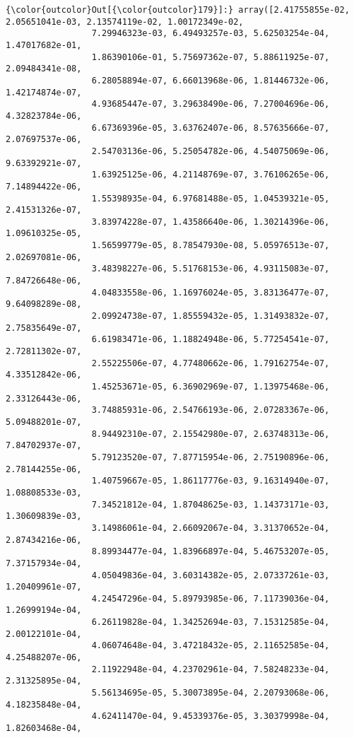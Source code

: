 \documentclass[11pt]{article}
\begin{document}
            \begin{Verbatim}[commandchars=\\\{\}]
{\color{outcolor}Out[{\color{outcolor}179}]:} array([2.41755855e-02, 2.05651041e-03, 2.13574119e-02, 1.00172349e-02,
                 7.29946323e-03, 6.49493257e-03, 5.62503254e-04, 1.47017682e-01,
                 1.86390106e-01, 5.75697362e-07, 5.88611925e-07, 2.09484341e-08,
                 6.28058894e-07, 6.66013968e-06, 1.81446732e-06, 1.42174874e-07,
                 4.93685447e-07, 3.29638490e-06, 7.27004696e-06, 4.32823784e-06,
                 6.67369396e-05, 3.63762407e-06, 8.57635666e-07, 2.07697537e-06,
                 2.54703136e-06, 5.25054782e-06, 4.54075069e-06, 9.63392921e-07,
                 1.63925125e-06, 4.21148769e-07, 3.76106265e-06, 7.14894422e-06,
                 1.55398935e-04, 6.97681488e-05, 1.04539321e-05, 2.41531326e-07,
                 3.83974228e-07, 1.43586640e-06, 1.30214396e-06, 1.09610325e-05,
                 1.56599779e-05, 8.78547930e-08, 5.05976513e-07, 2.02697081e-06,
                 3.48398227e-06, 5.51768153e-06, 4.93115083e-07, 7.84726648e-06,
                 4.04833558e-06, 1.16976024e-05, 3.83136477e-07, 9.64098289e-08,
                 2.09924738e-07, 1.85559432e-05, 1.31493832e-07, 2.75835649e-07,
                 6.61983471e-06, 1.18824948e-06, 5.77254541e-07, 2.72811302e-07,
                 2.55225506e-07, 4.77480662e-06, 1.79162754e-07, 4.33512842e-06,
                 1.45253671e-05, 6.36902969e-07, 1.13975468e-06, 2.33126443e-06,
                 3.74885931e-06, 2.54766193e-06, 2.07283367e-06, 5.09488201e-07,
                 8.94492310e-07, 2.15542980e-07, 2.63748313e-06, 7.84702937e-07,
                 5.79123520e-07, 7.87715954e-06, 2.75190896e-06, 2.78144255e-06,
                 1.40759667e-05, 1.86117776e-03, 9.16314940e-07, 1.08808533e-03,
                 7.34521812e-04, 1.87048625e-03, 1.14373171e-03, 1.30609839e-03,
                 3.14986061e-04, 2.66092067e-04, 3.31370652e-04, 2.87434216e-06,
                 8.89934477e-04, 1.83966897e-04, 5.46753207e-05, 7.37157934e-04,
                 4.05049836e-04, 3.60314382e-05, 2.07337261e-03, 1.20409961e-07,
                 4.24547296e-04, 5.89793985e-06, 7.11739036e-04, 1.26999194e-04,
                 6.26119828e-04, 1.34252694e-03, 7.15312585e-04, 2.00122101e-04,
                 4.06074648e-04, 3.47218432e-05, 2.11652585e-04, 4.25488207e-06,
                 2.11922948e-04, 4.23702961e-04, 7.58248233e-04, 2.31325895e-04,
                 5.56134695e-05, 5.30073895e-04, 2.20793068e-06, 4.18235848e-04,
                 4.62411470e-04, 9.45339376e-05, 3.30379998e-04, 1.82603468e-04,

\end{Verbatim}
\end{document}
